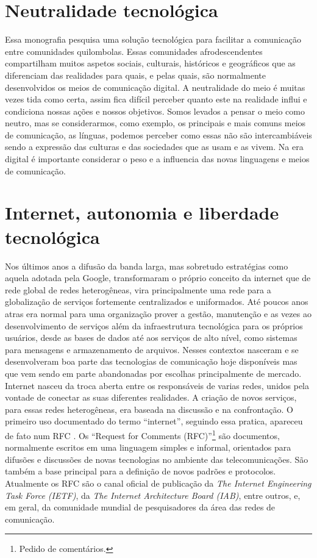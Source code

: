 \section{Neutralidade tecnológica}
Essa monografia pesquisa uma solução tecnológica para facilitar a
comunicação entre comunidades quilombolas. Essas comunidades
afrodescendentes compartilham muitos aspetos sociais, culturais,
históricos e geográficos que as diferenciam das realidades para quais,
e pelas quais, são normalmente desenvolvidos os meios de comunicação
digital. A neutralidade do meio é muitas vezes tida como certa, assim
fica difícil perceber quanto este na realidade influi e condiciona
nossas ações e nossos objetivos. Somos levados a pensar o meio como
neutro, mas se considerarmos, como exemplo, os principais e mais comuns
meios de comunicação, as línguas, podemos perceber como essas não são
intercambiáveis sendo a expressão das culturas e das sociedades que as
usam e as vivem. Na era digital é importante considerar o peso e a
influencia das novas linguagens e meios de comunicação. 

\section{Internet, autonomia e liberdade tecnológica}
Nos últimos anos a difusão da banda larga, mas sobretudo estratégias
como aquela adotada pela Google, transformaram o próprio conceito da
internet que de rede global de redes heterogêneas, vira principalmente
uma rede para a globalização de serviços fortemente centralizados e
uniformados. Até poucos anos atras era normal para uma organização
prover a gestão, manutenção e as vezes ao desenvolvimento de serviços
além da infraestrutura tecnológica para os próprios usuários, desde as
bases de dados até aos serviços de alto nível, como sistemas para
mensagens e armazenamento de arquivos. Nesses contextos nasceram e se
desenvolveram boa parte das tecnologias de comunicação hoje
disponíveis mas que vem sendo em parte abandonadas por escolhas
principalmente de mercado. Internet nasceu da troca aberta entre os
responsáveis de varias redes, unidos pela vontade de conectar as suas
diferentes realidades. A criação de novos serviços, para essas redes
heterogêneas, era baseada na discussão e na confrontação. O primeiro
uso documentado do termo ``internet'', seguindo essa pratica, apareceu
de fato num RFC \citep{RFC675}. Os ``Request for Comments
(RFC)''\footnote{Pedido de comentários.} são documentos, normalmente
escritos em uma linguagem simples e informal, orientados para
difusões e discussões de novas tecnologias no ambiente das
telecomunicações. São também a base principal para a definição de
novos padrões e protocolos. Atualmente os RFC são o canal oficial de
publicação da \emph{The Internet Engineering Task Force (IETF)}, da
\emph{The Internet Architecture Board (IAB)}, entre outros, e, em
geral, da comunidade mundial de pesquisadores da área das redes de
comunicação.

